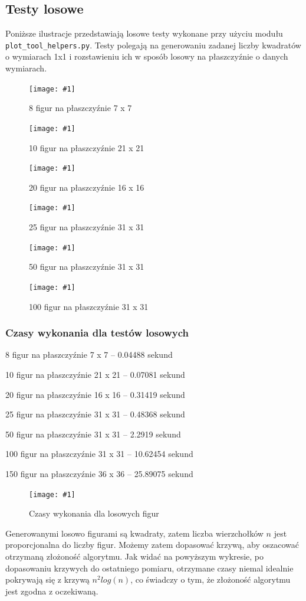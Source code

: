 \documentclass[12pt]{article}
\let\tempone\itemize
\let\temptwo\enditemize
\renewenvironment{itemize}{\tempone\setlength{\itemsep}{0cm}}{\temptwo}
\newcommand{\imgcustomsize}[3]{
	\begin{figure}[H]
		\centering
		\texttt{[image: \#1]}
		\caption{#2}
		\label{#1}
	\end{figure}
}
\begin{document}
		\subsection{Testy losowe}
			Poniższe ilustracje przedstawiają losowe testy wykonane przy użyciu modułu \lstinline|plot_tool_helpers.py|. Testy polegają na generowaniu zadanej liczby kwadratów o wymiarach 1x1 i rozstawieniu ich w sposób losowy na płaszczyźnie o danych wymiarach.
			
			\imgcustomsize{test-losowe1.jpg}{8 figur na płaszczyźnie 7 x 7}{1}
			\imgcustomsize{test-losowe2.jpg}{10 figur na płaszczyźnie 21 x 21}{1}
			\imgcustomsize{test-losowe3.jpg}{20 figur na płaszczyźnie 16 x 16}{1}
			\imgcustomsize{test-losowe4.jpg}{25 figur na płaszczyźnie 31 x 31}{1}
			\imgcustomsize{test-losowe5.jpg}{50 figur na płaszczyźnie 31 x 31}{1}
			\imgcustomsize{test-losowe6.jpg}{100 figur na płaszczyźnie 31 x 31}{1}
		
		\subsubsection{Czasy wykonania dla testów losowych} \label{sssec:times}
			\begin{itemize}
				\item 8 figur na płaszczyźnie 7 x 7 -- 0.04488 sekund
				\item 10 figur na płaszczyźnie 21 x 21 -- 0.07081 sekund
				\item 20 figur na płaszczyźnie 16 x 16 -- 0.31419 sekund
				\item 25 figur na płaszczyźnie 31 x 31 -- 0.48368 sekund
				\item 50 figur na płaszczyźnie 31 x 31 -- 2.2919 sekund
				\item 100 figur na płaszczyźnie 31 x 31 -- 10.62454 sekund
				\item 150 figur na płaszczyźnie 36 x 36 -- 25.89075 sekund
			\end{itemize}
			
			\imgcustomsize{pomiary.jpg}{Czasy wykonania dla losowych figur}{0.75}
			
			Generowanymi losowo figurami są kwadraty, zatem liczba wierzchołków $ n $ jest proporcjonalna do liczby figur. Możemy zatem dopasować krzywą, aby oszacować otrzymaną złożoność algorytmu. Jak widać na powyższym wykresie, po dopasowaniu krzywych do ostatniego pomiaru, otrzymane czasy niemal idealnie pokrywają się z krzywą $ n^2 log(n) $, co świadczy o tym, że złożoność algorytmu jest zgodna z oczekiwaną.  
			\newpage
			
\end{document}
